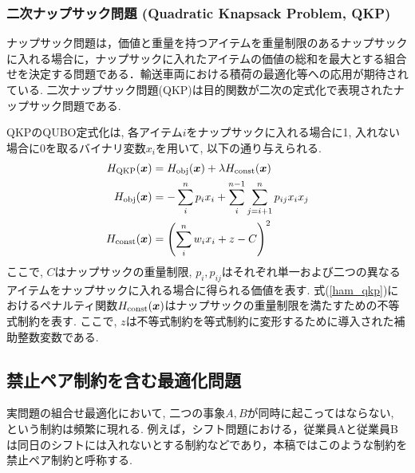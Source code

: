 \documentclass[submit,techrep,noauthor]{ipsj}
\begin{document}
\subsubsection{二次ナップサック問題 (Quadratic Knapsack Problem, QKP)}
ナップサック問題は，価値と重量を持つアイテムを重量制限のあるナップサックに入れる場合に，ナップサックに入れたアイテムの価値の総和を最大とする組合せを決定する問題である．輸送車両における積荷の最適化等への応用が期待されている. 二次ナップサック問題(QKP)は目的関数が二次の定式化で表現されたナップサック問題である. 


QKPのQUBO定式化は, 各アイテム$i$をナップサックに入れる場合に1, 入れない場合に0を取るバイナリ変数$x_{i}$を用いて, 以下の通り与えられる.
\begin{align}
H_{\rm{QKP}}(\bm{x}) &= H_{\rm{obj}}(\bm{x}) + \lambda H_{\rm{const}}(\bm{x})\nonumber\\
H_{\rm{obj}}(\bm{x}) &= -\sum_{i}^{n}p_{i}x_{i}+\sum_{i}^{n-1}\sum_{j=i+1}^{n}p_{ij}x_{i}x_{j}\nonumber\\
H_{\rm{const}}(\bm{x}) &= \left(\sum_{i}^{n}w_{i}x_{i}+z-C\right)^{2} \label{ham_qkp}
\end{align}
ここで, $C$はナップサックの重量制限, $p_{i}, p_{ij}$はそれぞれ単一および二つの異なるアイテムをナップサックに入れる場合に得られる価値を表す. 式(\ref{ham_qkp})におけるペナルティ関数$H_{\rm{const}}(\bm{x})$はナップサックの重量制限を満たすための不等式制約を表す. ここで, $z$は不等式制約を等式制約に変形するために導入された補助整数変数である.

\subsection{禁止ペア制約を含む最適化問題}
実問題の組合せ最適化において, 二つの事象$A, B$が同時に起こってはならない, という制約は頻繁に現れる. 例えば，シフト問題における，従業員Aと従業員Bは同日のシフトには入れないとする制約などであり，本稿ではこのような制約を禁止ペア制約と呼称する. 
\end{document}
